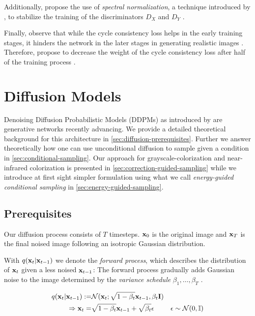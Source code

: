 Additionally, \citeauthor*{mehri} propose the use of \textit{spectral normalization}, a technique introduced by , to stabilize the training of the discriminators $D_X$ and $D_Y$ \parencite{spectral-norm, mehri}.

Finally, \citeauthor*{mehri} observe that while the cycle consistency loss helps in the early training stages, it hinders the network in the later stages in generating realistic images \parencite{mehri}.
Therefore, \citeauthor*{mehri} propose to decrease the weight of the cycle consistency loss after half of the training process \parencite{mehri}.

\section{Diffusion Models}
Denoising Diffusion Probabilistic Models (DDPMs) as introduced by \cite{ddpm} are generative networks recently advancing.  %
We provide a detailed theoretical background for this architecture in \autoref{sec:diffusion-prerequisites}.
Further we answer theoretically how one can use unconditional diffusion to sample given a condition in \autoref{sec:conditional-sampling}.
Our approach for grayscale-colorization and near-infrared colorization is presented in \autoref{sec:correction-guided-sampling} while
we introduce at first sight simpler formulation using what we call \textit{energy-guided conditional sampling} in \autoref{sec:energy-guided-sampling}.

\subsection{Prerequisites}
\label{sec:diffusion-prerequisites}
Our diffusion process consists of $T$ timesteps.
$\mathbf{x}_0$ is the original image and $\mathbf{x}_T$ is the final noised image following an isotropic Gaussian distribution.

With $q(\mathbf{x}_t | \mathbf{x}_{t-1})$ we denote the \textit{forward process}, which describes the distribution of $\mathbf{x}_t$ given a less noised $\mathbf{x}_{t-1}$:
The forward process gradually adds Gaussian noise to the image determined by the \textit{variance schedule} $\beta_1, \dots, \beta_T$ \parencite[\autoref{eqn:forward-process-definition}]{ddpm}.

\begin{equation}
   \label{eqn:forward-process-definition}
   \begin{aligned}
      q(\mathbf{x}_t | \mathbf{x}_{t-1}) := & \mathcal{N}(\mathbf{x}_t; \sqrt{1 - \beta_t}\mathbf{x}_{t-1}, \beta_t \mathbf{I})                                            \\
      \Rightarrow \mathbf{x}_t =            & \sqrt{1 - \beta_t}\mathbf{x}_{t-1} + \sqrt{\beta_t} \epsilon              & \epsilon \sim \mathcal{N}(0, \mathbb{I})
   \end{aligned}
\end{equation}

